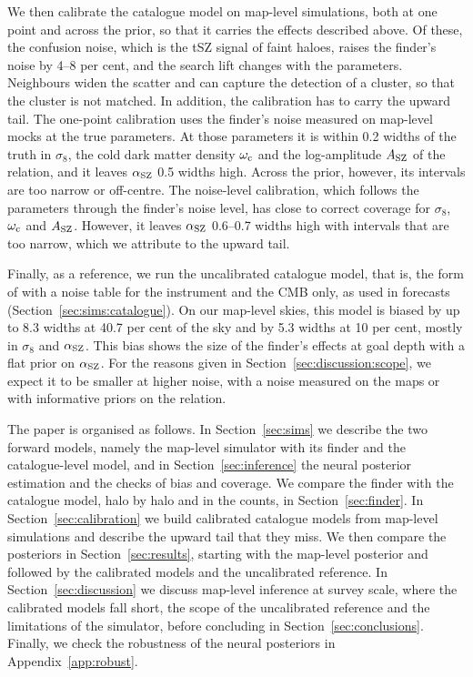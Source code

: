 We then calibrate the catalogue model on map-level simulations, both at one point and across the prior,
so that it carries the effects described above. Of these, the confusion noise, which is the tSZ signal of
faint haloes, raises the finder's noise by 4--8 per cent, and the search lift changes with the parameters.
Neighbours widen the scatter and can capture the detection of a cluster, so that the cluster is not
matched. In addition, the calibration has to carry the upward tail. The one-point calibration uses the
finder's noise measured on map-level mocks at the true parameters. At those parameters it is within 0.2
widths of the truth in $\sigma_8$, the cold dark matter density $\omega_\mathrm{c}$ and the log-amplitude $A_\mathrm{SZ}$ of the relation, and it leaves $\alpha_\mathrm{SZ}$ 0.5
widths high. Across the prior, however, its intervals are too narrow or
off-centre. The noise-level calibration, which follows the parameters through
the finder's noise level, has close to correct coverage for $\sigma_8$, $\omega_\mathrm{c}$ and $A_\mathrm{SZ}$. However, it leaves $\alpha_\mathrm{SZ}$ 0.6--0.7 widths high with intervals that are too narrow, which we attribute to the upward tail.

Finally, as a reference, we run the uncalibrated catalogue model, that is, the form of
\citet{Zubeldia2025} with a noise table for the instrument and the CMB only, as used in forecasts
(Section~\ref{sec:sims:catalogue}). On our map-level skies, this model is biased by up to 8.3 widths at
40.7 per cent of the sky and by 5.3 widths at 10 per cent, mostly in $\sigma_8$ and $\alpha_\mathrm{SZ}$. This bias
shows the size of the finder's effects at goal depth with a flat prior on $\alpha_\mathrm{SZ}$. For the reasons given
in Section~\ref{sec:discussion:scope}, we expect it to be smaller at higher noise, with a noise measured on
the maps or with informative priors on the relation.

The paper is organised as follows. In Section~\ref{sec:sims} we describe the two forward models, namely
the map-level simulator with its finder and the catalogue-level model, and in
Section~\ref{sec:inference} the neural posterior estimation and the checks of bias and coverage. We
compare the finder with the catalogue model, halo by halo and in the counts, in Section~\ref{sec:finder}. In Section~\ref{sec:calibration} we build calibrated catalogue models from
map-level simulations and describe the upward tail that they miss. We then compare the posteriors in
Section~\ref{sec:results}, starting with the map-level posterior and followed by the calibrated models and
the uncalibrated reference. In Section~\ref{sec:discussion} we discuss map-level inference at survey
scale, where the calibrated models fall short, the scope of the uncalibrated reference and the limitations
of the simulator, before concluding in Section~\ref{sec:conclusions}. Finally, we check the robustness of
the neural posteriors in Appendix~\ref{app:robust}.
